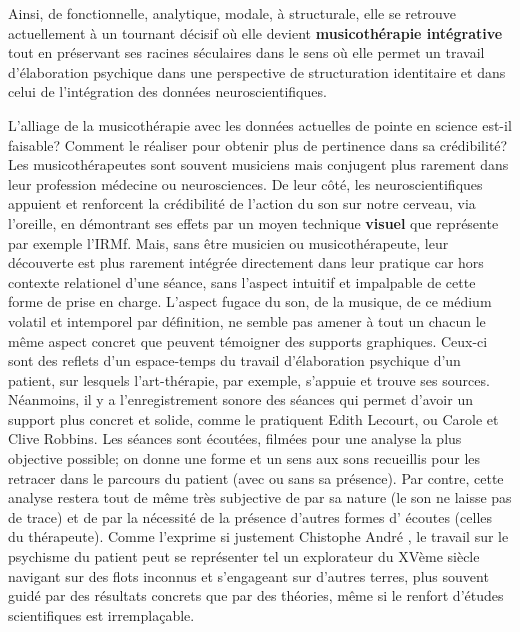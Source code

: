  Ainsi, de fonctionnelle, analytique, mo\-da\-le,  à 
struc\-tu\-rale, elle se retrouve actuellement 
 à un tournant décisif où elle devient 
 \textbf{ musicothérapie intégrative} tout en préservant ses racines
 séculaires dans le sens où elle permet un travail d'élaboration psychique dans une perspective de structuration identitaire \autocite[ch. III, p. 53, 
105]{vrait_musicotherapie_2018} et dans celui de l'intégration des données 
neuroscientifiques.
 


 


L'alliage de la musicothérapie avec les données actuelles de pointe en
science est-il faisable? Comment le réaliser pour obtenir plus de pertinence
dans sa crédibilité?
Les musicothérapeutes sont souvent musiciens mais conjugent plus
rarement dans leur profession
médecine ou neurosciences. De leur côté, les neuroscientifiques appuient
et renforcent la crédibilité de l'action du son sur notre cerveau, via
l'oreille, en démontrant ses effets par un moyen technique
\textbf{visuel} que représente par exemple l'IRMf. Mais, sans être musicien ou
musicothérapeute, leur découverte est plus rarement intégrée
directement dans leur pratique car hors contexte relationel d'une
séance, sans l'aspect intuitif et impalpable de cette forme de prise
en charge.
L'aspect fugace du son, de la musique, de ce médium volatil et
intemporel par
définition, ne semble pas amener à tout un chacun le
même aspect concret que peuvent témoigner des supports
graphiques. Ceux-ci sont des 
reflets d'un espace-temps du travail d'élaboration
psychique d'un patient, sur lesquels l'art-thérapie, par exemple, s'appuie et trouve
ses sources.
Néanmoins, il y a l'enregistrement sonore des séances qui 
permet d'avoir un support plus concret et solide, comme le pratiquent Edith Lecourt, ou Carole et Clive 
Robbins.  \autocite {lecourt_les_2017}
Les séances sont écoutées, filmées pour une
analyse la plus objective possible; on donne 
une forme et un sens aux sons recueillis pour les retracer dans le
parcours du patient (avec ou sans sa présence). Par contre, cette analyse  restera
tout de même très subjective de par sa nature (le son ne laisse pas
de trace) et de par la nécessité de la présence d'autres formes d'
écoutes (celles du thérapeute).
Comme l'exprime si justement Chistophe André \autocite[154]{van_eersel_cerveau}, le travail sur le psychisme du patient peut se  représenter tel un
explorateur du XVème siècle navigant sur des flots inconnus et
s'engageant sur d'autres terres, plus souvent guidé par des résultats
concrets que par des théories, même si le renfort d'études
scientifiques est irremplaçable.

